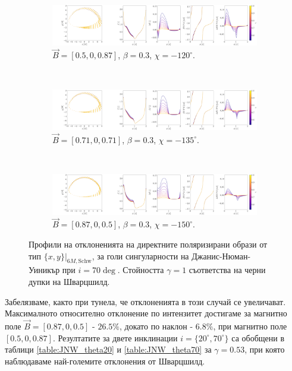 \begin{figure}[!htb]
	\centering
	\begin{subfigure}{12cm}
	\hspace{-2cm}
	\includegraphics[scale = 0.15]{JNW_delta_figs_B_0.5_0.0_0.87_70_deg_direct.png}
	\caption{$\vec{B} = [0.5, 0, 0.87]$, $\beta = 0.3$, $\chi = -120^\circ$.}
\end{subfigure}\\
\begin{subfigure}{12cm}
	\hspace{-2cm}
	\includegraphics[scale = 0.15]{JNW_delta_figs_B_0.71_0.0_0.71_70_deg_direct.png}
	\caption{$\vec{B} = [0.71, 0, 0.71]$, $\beta = 0.3$, $\chi = -135^\circ$.}
\end{subfigure}\\
\begin{subfigure}{12cm}
	\hspace{-2cm}
	\includegraphics[scale = 0.15]{JNW_delta_figs_B_0.87_0.0_0.5_70_deg_direct.png}
	\caption{$\vec{B} = [0.87, 0, 0.5]$, $\beta = 0.3$, $\chi = -150^\circ$.}
\end{subfigure}
	\caption[Профили на отклоненията на директните поляризирани образи oт тип $\{x,y\}\vert_{6M, \text{Schw}}$, за $i = 70\deg$ за голи сингуларности на Джанис-Нюман-Уиникър.]{\small Профили на отклоненията на директните поляризирани образи от тип $\{x,y\}\vert_{6M, \text{Schw}}$, за голи сингуларности на Джанис-Нюман-Уиникър при $i = 70\deg$. Стойността $\gamma = 1$ съответства на черни дупки на Шварцшилд.} 
	\label{JNW_delta_r6_70_deg}
\end{figure}
Забелязваме, както при тунела, че отклоненията в този случай се увеличават. Максималното относително отклонение по интензитет достигаме за магнитно поле $\vec{B} = [0.87,0,0.5]$ - $26.5\%$, докато по наклон - $6.8\%$, при магнитно поле $[0.5, 0, 0.87]$. Резултатите за двете инклинации $i = \{20^\circ, 70^\circ\}$ са обобщени в таблици \ref{table:JNW_theta20} и \ref{table:JNW_theta70} за $\gamma = 0.53$, при която наблюдаваме най-големите отклонения от Шварцшилд.


